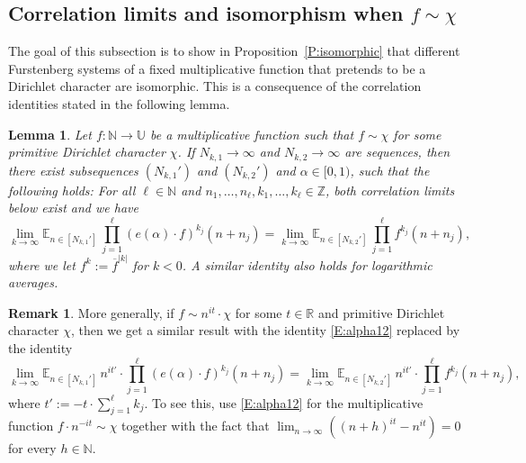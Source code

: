 \documentclass[11pt]{amsart}
\newtheorem{lemma}{Lemma}[section]
\theoremstyle{definition}
\newtheorem*{remark}{Remark}
\newcommand{\E}{{\mathbb E}}
\newcommand{\N}{{\mathbb N}}
\newcommand{\R}{{\mathbb R}}
\newcommand{\Z}{{\mathbb Z}}
\newcommand{\U}{{\mathbb U}}
\begin{document}
\subsection{Correlation limits and isomorphism  when $f\sim \chi$} \label{SS:isomorphic}
The goal of this subsection is to show  in Proposition~\ref{P:isomorphic} that
 different Furstenberg systems of a fixed multiplicative function   that pretends to be a Dirichlet character  are isomorphic. This is a consequence of the correlation identities stated in the following lemma.
\begin{lemma}\label{L:ceslog}
	Let $f\colon \N\to \U$ be a multiplicative function such  that $f\sim  \chi$ for some primitive  Dirichlet character $\chi$.
	If $N_{k,1}\to \infty$ and $N_{k,2}\to\infty$ are sequences, then there exist subsequences
	$(N_{k,1}')$ and $(N_{k,2}')$ and $\alpha\in [0,1)$, such that the following holds:
		For all $\ell\in \N$ and $n_1,\ldots, n_\ell, k_1,\ldots, k_\ell\in \Z$, both   correlation limits below exist and we have
	\begin{equation}\label{E:alpha12}
	\lim_{k\to\infty}\E_{n\in[N_{k,1}']}\,  \prod_{j=1}^\ell(e(\alpha)\cdot f)^{k_j}(n+n_j)
	= \lim_{k\to\infty}\E_{n\in[N_{k,2}']} \,  \prod_{j=1}^\ell f^{k_j}(n+n_j),
	\end{equation}
 where we let  $f^k:=\overline{f}^{|k|}$ for $k<0$.
 A similar identity also holds for logarithmic averages.
\end{lemma}
\begin{remark}
More generally, if $f\sim n^{it}\cdot \chi$ for some $t\in \R$ and primitive Dirichlet character $\chi$, then we get a similar result with the identity \eqref{E:alpha12} replaced by the identity
	\begin{equation}\label{E:alpha12'}
	\lim_{k\to\infty} \E_{n\in[N_{k,1}']}\, n^{it'}\cdot \prod_{j=1}^\ell(e(\alpha)\cdot f)^{k_j}(n+n_j)
	= \lim_{k\to\infty} \E_{n\in[N_{k,2}']} \, n^{it'}\cdot \prod_{j=1}^\ell f^{k_j}(n+n_j),
\end{equation}
where $t':=-t\cdot \sum_{j=1}^\ell k_j$.
To see this,  use  \eqref{E:alpha12}  for the multiplicative function $f\cdot n^{-it} \sim \chi$ together with the fact that   $\lim_{n\to\infty}((n+h)^{it}-n^{it})=0$ for every $h\in \N$.
\end{remark}
\end{document}
